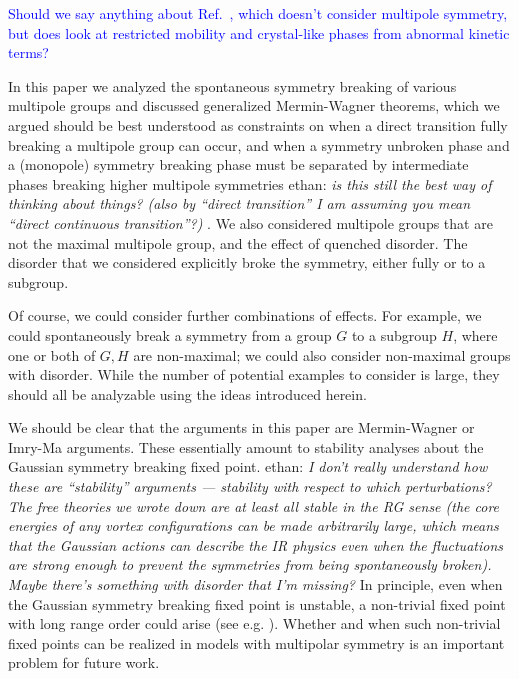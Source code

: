 \documentclass[pra,aps,twocolumn, amsfonts,amsmath,amssymb,nofootinbib,superscriptaddress]{revtex4-2}
\newcommand{\charlie}[1]{\textcolor{Blue}{#1}}
\newcommand{\ethan}[1]{ { \color{blue} \footnotesize \textsf{ethan: \textsl{#1}} }}
\begin{document}
\charlie{Should we say anything about Ref.~\cite{Argurio2021}, which doesn't consider multipole symmetry, but does look at restricted mobility and crystal-like phases from abnormal kinetic terms?}

In this paper we analyzed the spontaneous symmetry breaking of various multipole groups and discussed generalized Mermin-Wagner theorems, which we argued should be best understood as constraints on when a direct transition fully breaking a multipole group can occur, and when a symmetry unbroken phase and a (monopole) symmetry breaking phase must be separated by intermediate phases breaking higher multipole symmetries \ethan{is this still the best way of thinking about things? (also by ``direct transition'' I am assuming you mean ``direct continuous transition''?)}. We also considered multipole groups that are not the maximal multipole group, and the effect of quenched disorder. The disorder that we considered explicitly broke the symmetry, either fully or to a subgroup.

Of course, we could consider further combinations of effects. For example, we could spontaneously break a symmetry from a group $G$ to a subgroup $H$, where one or both of $G,H$ are non-maximal; we could also consider non-maximal groups with disorder. While the number of potential examples to consider is large, they should all be analyzable using the ideas introduced herein. 

We should be clear that the arguments in this paper are Mermin-Wagner or Imry-Ma arguments. These essentially amount to stability analyses about the Gaussian symmetry breaking fixed point. \ethan{I don't really understand how these are ``stability'' arguments --- stability with respect to which perturbations? The free theories we wrote down are at least all stable in the RG sense (the core energies of any vortex configurations can be made arbitrarily large, which means that the Gaussian actions can describe the IR physics even when the fluctuations are strong enough to prevent the symmetries from being spontaneously broken). Maybe there's something with disorder that I'm missing?}  In principle, even when the Gaussian symmetry breaking fixed point is unstable, a non-trivial fixed point with long range order could arise (see e.g. \cite{TonerRadzihovsky}). Whether and when such non-trivial fixed points can be realized in models with multipolar symmetry is an important problem for future work. 
\end{document}
